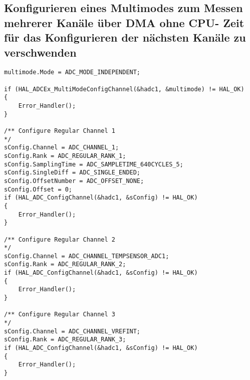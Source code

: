 \subsection{Konfigurieren eines Multimodes zum Messen mehrerer Kanäle über DMA ohne CPU- Zeit für das Konfigurieren der nächsten Kanäle zu verschwenden}
\label{subsec:adc-multimode}
\begin{lstlisting}[caption={Konfigurieren des Multimodes des internen ADC mit verschiedenen Rängen}, label=lst:multimode-adc]
multimode.Mode = ADC_MODE_INDEPENDENT;

if (HAL_ADCEx_MultiModeConfigChannel(&hadc1, &multimode) != HAL_OK)
{
    Error_Handler();
}

/** Configure Regular Channel 1
*/
sConfig.Channel = ADC_CHANNEL_1;
sConfig.Rank = ADC_REGULAR_RANK_1;
sConfig.SamplingTime = ADC_SAMPLETIME_640CYCLES_5;
sConfig.SingleDiff = ADC_SINGLE_ENDED;
sConfig.OffsetNumber = ADC_OFFSET_NONE;
sConfig.Offset = 0;
if (HAL_ADC_ConfigChannel(&hadc1, &sConfig) != HAL_OK)
{
    Error_Handler();
}

/** Configure Regular Channel 2
*/
sConfig.Channel = ADC_CHANNEL_TEMPSENSOR_ADC1;
sConfig.Rank = ADC_REGULAR_RANK_2;
if (HAL_ADC_ConfigChannel(&hadc1, &sConfig) != HAL_OK)
{
    Error_Handler();
}

/** Configure Regular Channel 3
*/
sConfig.Channel = ADC_CHANNEL_VREFINT;
sConfig.Rank = ADC_REGULAR_RANK_3;
if (HAL_ADC_ConfigChannel(&hadc1, &sConfig) != HAL_OK)
{
    Error_Handler();
}
\end{lstlisting}